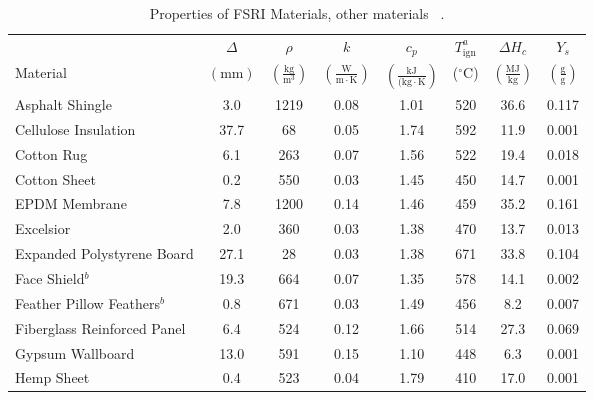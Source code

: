\begin{table}[!h]
\caption[Properties of FSRI Materials, other materials]{Properties of FSRI Materials, other materials ~\cite{McKinnon:FSRI2023_Data}.}
\centering
\begin{tabular}{|p{6.5cm}|c|c|c|c|c|c|c|}
\hline
            & \centering$\Delta$& \centering$\rho$& \centering$k$& \centering$c_{p}$ &\centering$T_{\mathrm{ign}}^{a}$&\centering$\Delta H_{c}$& $Y_{s}$ \\
Material    & \centering$\mathrm{\left(mm\right)}$ & \centering$\mathrm{\left(\frac{kg}{m^{3}}\right)}$ & \centering$\mathrm{\left(\frac{W}{m\cdot K}\right)}$ & \centering$\mathrm{\left(\frac{kJ}{(kg\cdot K}\right)}$ & \centering($\mathrm{^{\circ}C}$)   & \centering$\left(\mathrm{\frac{MJ}{kg}}\right)$ & $\mathrm{\left(\frac{g}{g}\right)}$ \\ \hline
\hline
Asphalt Shingle                                   & 3.0  & 1219 & 0.08 & 1.01 & 520 & 36.6 & 0.117 \\\hline
Cellulose Insulation                              & 37.7 & 68   & 0.05 & 1.74 & 592 & 11.9 & 0.001 \\\hline
Cotton Rug                                        & 6.1  & 263  & 0.07 & 1.56 & 522 & 19.4 & 0.018 \\\hline
Cotton Sheet                                      & 0.2  & 550  & 0.03 & 1.45 & 450 & 14.7 & 0.001 \\\hline
EPDM Membrane                                     & 7.8  & 1200 & 0.14 & 1.46 & 459 & 35.2 & 0.161 \\\hline
Excelsior                                         & 2.0  & 360  & 0.03 & 1.38 & 470 & 13.7 & 0.013 \\\hline
Expanded Polystyrene Board                        & 27.1 & 28   & 0.03 & 1.38 & 671 & 33.8 & 0.104 \\\hline
Face Shield$^{b}$                                 & 19.3 & 664  & 0.07 & 1.35 & 578 & 14.1 & 0.002 \\\hline
Feather Pillow Feathers$^{b}$                     & 0.8  & 671  & 0.03 & 1.49 & 456 & 8.2  & 0.007 \\\hline
Fiberglass Reinforced Panel                       & 6.4  & 524  & 0.12 & 1.66 & 514 & 27.3 & 0.069 \\\hline
Gypsum Wallboard                                  & 13.0 & 591  & 0.15 & 1.10 & 448 & 6.3  & 0.001 \\\hline
Hemp Sheet                                        & 0.4  & 523  & 0.04 & 1.79 & 410 & 17.0 & 0.001 \\\hline

\end{tabular}
\end{table}
